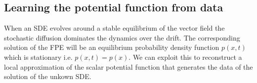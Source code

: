 \documentclass[../main.tex]{subfiles}
\begin{document}
\subsection{Learning the potential function from data}\label{subsec4.2}
When an SDE evolves around a stable equilibrium of the vector field the stochastic diffusion dominates the dynamics over the drift.
The corresponding solution of the FPE will be an equilibrium probability density function $p(x,t)$ which is stationary i.e. $p(x,t)=p(x)$.
We can exploit this to reconstruct a local approximation of the scalar potential function that generates the data of the solution of the unkown SDE.

\end{document}
